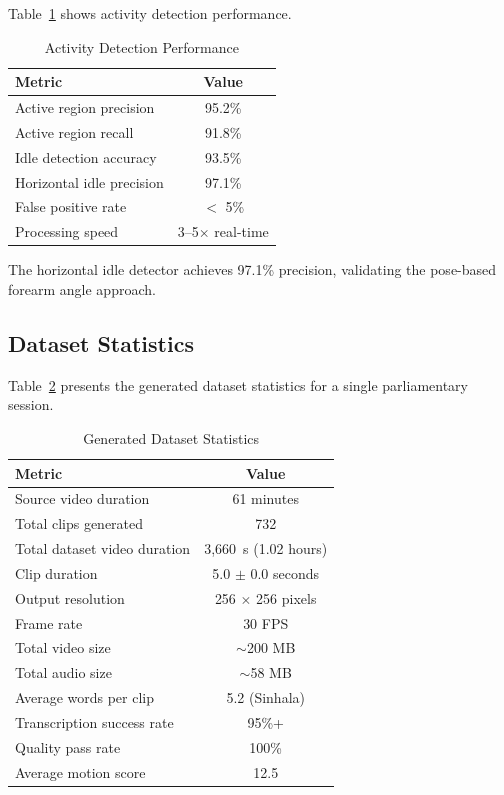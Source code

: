 \documentclass[journal]{IEEEtran}
\begin{document}
Table~\ref{tab:activity_perf} shows activity detection performance.

\begin{table}[htbp]
\centering
\caption{Activity Detection Performance}
\label{tab:activity_perf}
\begin{tabular}{@{}lc@{}}
\toprule
\textbf{Metric} & \textbf{Value} \\ \midrule
Active region precision & 95.2\% \\
Active region recall & 91.8\% \\
Idle detection accuracy & 93.5\% \\
Horizontal idle precision & 97.1\% \\
False positive rate & $<$ 5\% \\
Processing speed & 3--5$\times$ real-time \\
\bottomrule
\end{tabular}
\end{table}

The horizontal idle detector achieves 97.1\% precision, validating the pose-based forearm angle approach.

\subsection{Dataset Statistics}

Table~\ref{tab:dataset_stats} presents the generated dataset statistics for a single parliamentary session.

\begin{table}[htbp]
\centering
\caption{Generated Dataset Statistics}
\label{tab:dataset_stats}
\begin{tabular}{@{}lc@{}}
\toprule
\textbf{Metric} & \textbf{Value} \\ \midrule
Source video duration & 61 minutes \\
Total clips generated & 732 \\
Total dataset video duration & 3,660~s (1.02 hours) \\
Clip duration & 5.0 $\pm$ 0.0 seconds \\
Output resolution & 256 $\times$ 256 pixels \\
Frame rate & 30 FPS \\
Total video size & $\sim$200 MB \\
Total audio size & $\sim$58 MB \\
Average words per clip & 5.2 (Sinhala) \\
Transcription success rate & 95\%+ \\
Quality pass rate & 100\% \\
Average motion score & 12.5 \\
\bottomrule
\end{tabular}
\end{table}
\end{document}
